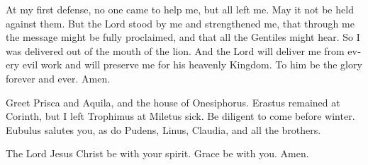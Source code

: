 \begin{paracol}{2}
\begin{otherlanguage}{english}
 At my first defense, no one came to help me, but all
left me. May it not be held against them.  But the Lord
stood by me and strengthened me, that through me the message might be
fully proclaimed, and that all the Gentiles might hear. So I was
delivered out of the mouth of the lion.  And the Lord
will deliver me from every evil work and will preserve me for his
heavenly Kingdom. To him be the glory forever and ever. Amen.

 Greet Prisca and Aquila, and the house of Onesiphorus.
 Erastus remained at Corinth, but I left Trophimus at
Miletus sick.  Be diligent to come before winter. Eubulus
salutes you, as do Pudens, Linus, Claudia, and all the brothers.

 The Lord Jesus Christ be with your spirit. Grace be with
you. Amen. \end{otherlanguage} \end{paracol}

